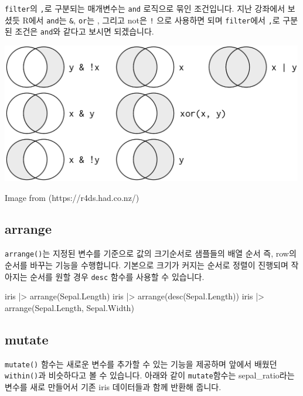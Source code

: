 \documentclass[
  a4paper,
]{book}
\newenvironment{Shaded}{\begin{snugshade}}{\end{snugshade}}
\newcommand{\FunctionTok}[1]{\textcolor[rgb]{0.28,0.35,0.67}{#1}}
\newcommand{\NormalTok}[1]{\textcolor[rgb]{0.00,0.23,0.31}{#1}}
\newcommand{\SpecialCharTok}[1]{\textcolor[rgb]{0.37,0.37,0.37}{#1}}
\begin{document}
\texttt{filter}의 \texttt{,}로 구분되는 매개변수는 \texttt{and} 로직으로
묶인 조건입니다. 지난 강좌에서 보셨듯 R에서 \texttt{and}는 \texttt{\&},
\texttt{or}는 \texttt{\textbar{}}, 그리고 not은 \texttt{!} 으로 사용하면
되며 \texttt{filter}에서 \texttt{,}로 구분된 조건은 \texttt{and}와
같다고 보시면 되겠습니다.

\includegraphics[width=5.20833in,height=\textheight]{images/07/03.png}

Image from (https://r4ds.had.co.nz/)

\hypertarget{arrange}{%
\subsection{arrange}\label{arrange}}

\texttt{arrange()}는 지정된 변수를 기준으로 값의 크기순서로 샘플들의
배열 순서 즉, row의 순서를 바꾸는 기능을 수행합니다. 기본으로 크기가
커지는 순서로 정렬이 진행되며 작아지는 순서를 원할 경우 \texttt{desc}
함수를 사용할 수 있습니다.

\begin{Shaded}
\begin{Highlighting}[]
\NormalTok{iris }\SpecialCharTok{|\textgreater{}} \FunctionTok{arrange}\NormalTok{(Sepal.Length)}
\NormalTok{iris }\SpecialCharTok{|\textgreater{}} \FunctionTok{arrange}\NormalTok{(}\FunctionTok{desc}\NormalTok{(Sepal.Length))}
\NormalTok{iris }\SpecialCharTok{|\textgreater{}} \FunctionTok{arrange}\NormalTok{(Sepal.Length, Sepal.Width)}
\end{Highlighting}
\end{Shaded}

\hypertarget{mutate}{%
\subsection{mutate}\label{mutate}}

\texttt{mutate()} 함수는 새로운 변수를 추가할 수 있는 기능을 제공하며
앞에서 배웠던 \texttt{within()}과 비슷하다고 볼 수 있습니다. 아래와 같이
\texttt{mutate}함수는 sepal\_ratio라는 변수를 새로 만들어서 기존 iris
데이터들과 함께 반환해 줍니다.
\end{document}
